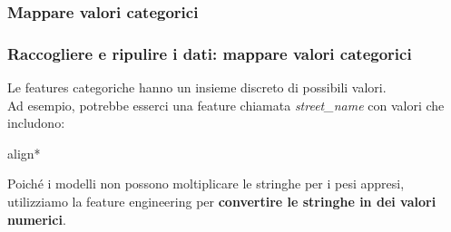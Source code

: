 \subsubsection[Mappare valori numerici]{Mappare valori categorici}
\begin{frame}

	\frametitle{{\color{GradientDescentDiagramBlue}Raccogliere e ripulire i dati}: mappare valori categorici}

		Le features categoriche hanno un insieme discreto di possibili valori.\\
		Ad esempio, potrebbe esserci una feature chiamata \textit{street\_name} con valori che includono:
		\begin{scriptsize}
			\begin{empheq}[box=\fcolorbox{blue!40!black!60}{yellow!10}]{align*}
			\end{empheq}
		\end{scriptsize}

		Poiché i modelli non possono moltiplicare le stringhe per i pesi appresi, utilizziamo la feature engineering per \textbf{convertire le stringhe in dei valori numerici}.


\end{frame}


